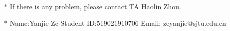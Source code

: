 \documentclass[12pt,a4paper]{article}
\theoremstyle{definition}
\begin{document}
	\noindent
	
	\noindent{}
	\begin{center}
		\footnotesize{\color{red}$*$ If there is any problem, please contact TA Haolin Zhou.}
		
		\footnotesize{\color{blue}$*$ Name:Yanjie Ze  \quad Student ID:519021910706 \quad Email: zeyanjie@sjtu.edu.cn}
		
	\end{center}
	
\end{document}
